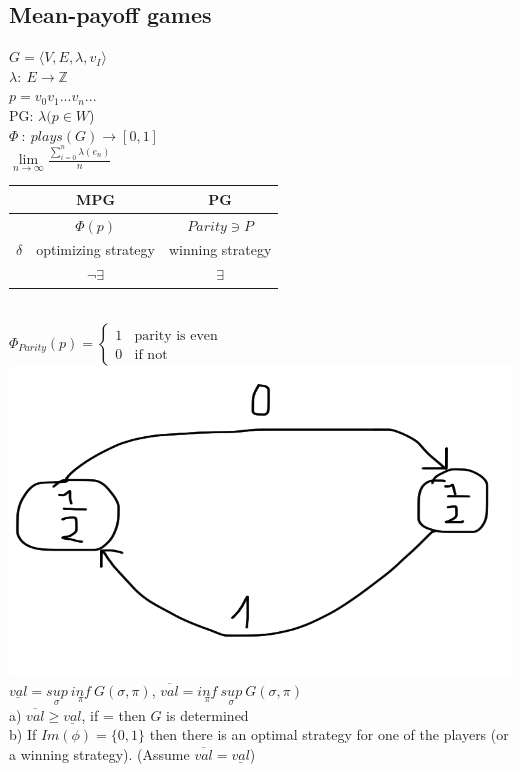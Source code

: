 \subsection*{Mean-payoff games}
$G = \langle V, E, \lambda, v_I \rangle$\\
$\lambda:\ E \rightarrow \mathbb{Z}$\\
$p = v_0v_1...v_n...$\\
PG: $\lambda(p \in W$)\\
$\Phi\ :\ plays(G) \rightarrow [0, 1]$\\
$\underset{n \rightarrow \infty}{\lim} \frac{\sum_{i=0}^{n} \lambda(e_n)}{n}$\\

\noindent
\begin{tabular}{| c | c | c |}
    \hline
    & \textbf{MPG} & \textbf{PG}\\
    \hline
    & $\Phi(p)$ & $Parity \ni P$\\
    \hline
    $\delta$ & optimizing strategy & winning strategy\\
    & $\lnot \exists$ & $\exists$\\
    \hline
\end{tabular}\\
$\Phi_{Parity}(p) = \begin{cases}
    1\ \ \ \ \text{parity is even}\\
    0\ \ \ \ \text{if not}
\end{cases}$
\\
\includegraphics[scale=0.1]{content/graphics/game9.png}\\
$\underline{val} = \underset{\sigma}{sup}\ \underset{\pi}{inf}\ G(\sigma, \pi)$,
$\overline{val} = \underset{\pi}{inf}\ \underset{\sigma}{sup}\ G(\sigma, \pi)$\\


\noindent
a) $\overline{val} \geq \underline{val}$, if = then $G$ is determined\\
b) If $Im(\phi) = \{0, 1\}$ then there is an optimal strategy for one of the players
(or a winning strategy). (Assume $\overline{val} = \underline{val}$)